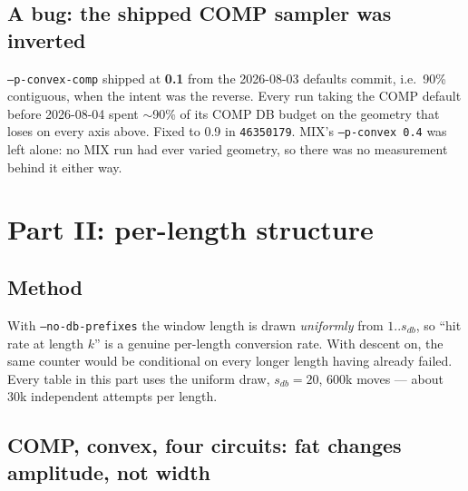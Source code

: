 \documentclass[11pt]{article}
\newcommand{\code}[1]{\texttt{#1}}
\begin{document}
\subsection{A bug: the shipped COMP sampler was inverted}

\code{--p-convex-comp} shipped at \textbf{0.1} from the 2026-08-03 defaults
commit, i.e.\ 90\% contiguous, when the intent was the reverse. Every run
taking the COMP default before 2026-08-04 spent $\sim$90\% of its COMP DB
budget on the geometry that loses on every axis above. Fixed to 0.9 in
\code{46350179}. MIX's \code{--p-convex 0.4} was left alone: no MIX run had
ever varied geometry, so there was no measurement behind it either way.

\section{Part II: per-length structure}

\subsection{Method}

With \code{--no-db-prefixes} the window length is drawn \emph{uniformly} from
$1..s_{db}$, so ``hit rate at length $k$'' is a genuine per-length conversion
rate. With descent on, the same counter would be conditional on every longer
length having already failed. Every table in this part uses the uniform draw,
$s_{db}=20$, 600k moves --- about 30k independent attempts per length.

\subsection{COMP, convex, four circuits: fat changes amplitude, not width}
\end{document}
